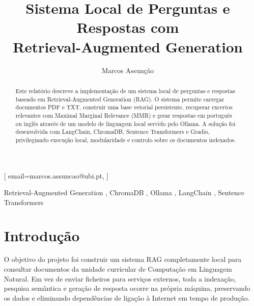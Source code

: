 \documentclass[]{ceurart}
\begin{document}


\title{Sistema Local de Perguntas e Respostas com \\ Retrieval-Augmented Generation}

\author{Marcos Assunção}[%
  email=marcos.assuncao@ubi.pt,
]
\address{Universidade da Beira Interior, Covilhã, Portugal}

\begin{abstract}
Este relatório descreve a implementação de um sistema local de perguntas e
respostas baseado em Retrieval-Augmented Generation (RAG). O sistema permite
carregar documentos PDF e TXT, construir uma base vetorial persistente,
recuperar excertos relevantes com Maximal Marginal Relevance (MMR) e gerar
respostas em português ou inglês através de um modelo de linguagem local
servido pelo Ollama. A solução foi desenvolvida com LangChain, ChromaDB,
Sentence Transformers e Gradio, privilegiando execução local, modularidade
e controlo sobre os documentos indexados.
\end{abstract}

\begin{keywords}
  Retrieval-Augmented Generation \sep
  ChromaDB \sep
  Ollama \sep
  LangChain \sep
  Sentence Transformers
\end{keywords}

\maketitle

\section{Introdução}

O objetivo do projeto foi construir um sistema RAG completamente local para
consultar documentos da unidade curricular de Computação em Linguagem Natural.
Em vez de enviar ficheiros para serviços externos, toda a indexação, pesquisa
semântica e geração de resposta ocorre na própria máquina, preservando os dados
e eliminando dependências de ligação à Internet em tempo de produção.
\end{document}
